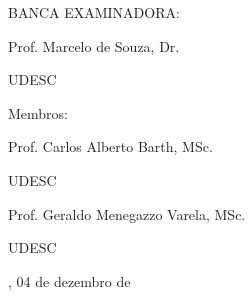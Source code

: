

%
% 
%
\begin{folhadeaprovacao}



	\begin{center}
		{\selectfont\MakeTextUppercase{\normalsize\imprimirautor}}
	\end{center}
	\vfill

	\vfill
	\begin{center}
		{\selectfont\MakeTextUppercase{\imprimirtitulo}}
	\end{center}
	\vfill




	\vfill

	\begin{center}

		{\selectfont BANCA EXAMINADORA: }
		\vspace*{1.75cm}

		Prof. Marcelo de Souza, Dr. \par
		UDESC
	\end{center}

	{Membros:}

	\begin{center}
		\vspace*{1.25cm}
		Prof. Carlos Alberto Barth, MSc. \par
		UDESC

		\vspace*{1.25cm}
		Prof. Geraldo Menegazzo Varela, MSc. \par
		UDESC
	\end{center}

	\vspace*{\fill}
	\begin{center}
		{\imprimirlocal, 04 de dezembro de \imprimirdata}
	\end{center}
	\vspace*{0.25cm}
\end{folhadeaprovacao}





